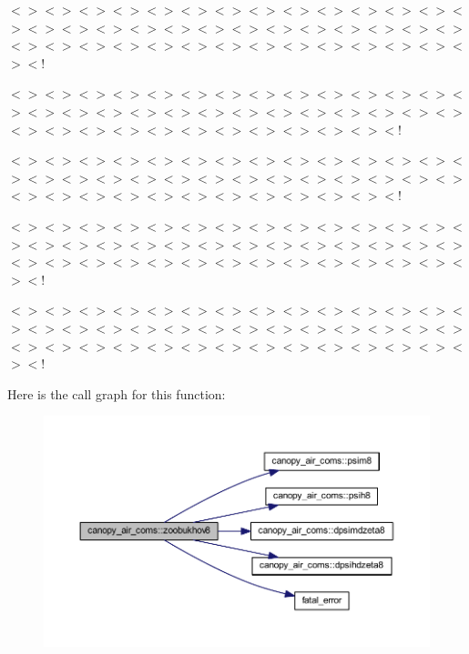 $<$$>$$<$$>$$<$$>$$<$$>$$<$$>$$<$$>$$<$$>$$<$$>$$<$$>$$<$$>$$<$$>$$<$$>$$<$$>$$<$$>$$<$$>$$<$$>$$<$$>$$<$$>$$<$$>$$<$$>$$<$$>$$<$$>$$<$$>$$<$$>$$<$$>$$<$$>$$<$$>$$<$$>$$<$$>$$<$$>$$<$$>$$<$$>$$<$$>$$<$$>$$<$$>$$<$$>$$<$$>$$<$$>$$<$$>$$<$$>$$<$$>$$<$!

$<$$>$$<$$>$$<$$>$$<$$>$$<$$>$$<$$>$$<$$>$$<$$>$$<$$>$$<$$>$$<$$>$$<$$>$$<$$>$$<$$>$$<$$>$$<$$>$$<$$>$$<$$>$$<$$>$$<$$>$$<$$>$$<$$>$$<$$>$$<$$>$$<$$>$$<$$>$$<$$>$$<$$>$$<$$>$$<$$>$$<$$>$$<$$>$$<$$>$$<$$>$$<$$>$$<$$>$$<$$>$$<$$>$$<$!

$<$$>$$<$$>$$<$$>$$<$$>$$<$$>$$<$$>$$<$$>$$<$$>$$<$$>$$<$$>$$<$$>$$<$$>$$<$$>$$<$$>$$<$$>$$<$$>$$<$$>$$<$$>$$<$$>$$<$$>$$<$$>$$<$$>$$<$$>$$<$$>$$<$$>$$<$$>$$<$$>$$<$$>$$<$$>$$<$$>$$<$$>$$<$$>$$<$$>$$<$$>$$<$$>$$<$$>$$<$$>$$<$$>$$<$!

$<$$>$$<$$>$$<$$>$$<$$>$$<$$>$$<$$>$$<$$>$$<$$>$$<$$>$$<$$>$$<$$>$$<$$>$$<$$>$$<$$>$$<$$>$$<$$>$$<$$>$$<$$>$$<$$>$$<$$>$$<$$>$$<$$>$$<$$>$$<$$>$$<$$>$$<$$>$$<$$>$$<$$>$$<$$>$$<$$>$$<$$>$$<$$>$$<$$>$$<$$>$$<$$>$$<$$>$$<$$>$$<$$>$$<$$>$$<$$>$$<$$>$$<$!

$<$$>$$<$$>$$<$$>$$<$$>$$<$$>$$<$$>$$<$$>$$<$$>$$<$$>$$<$$>$$<$$>$$<$$>$$<$$>$$<$$>$$<$$>$$<$$>$$<$$>$$<$$>$$<$$>$$<$$>$$<$$>$$<$$>$$<$$>$$<$$>$$<$$>$$<$$>$$<$$>$$<$$>$$<$$>$$<$$>$$<$$>$$<$$>$$<$$>$$<$$>$$<$$>$$<$$>$$<$$>$$<$$>$$<$$>$$<$$>$$<$$>$$<$! 

Here is the call graph for this function\+:\nopagebreak
\begin{figure}[H]
\begin{center}
\leavevmode
\includegraphics[width=350pt]{namespacecanopy__air__coms_afef697305b4b30385c5206f48d9e787c_cgraph}
\end{center}
\end{figure}


